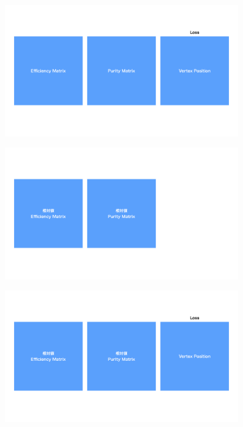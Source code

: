 \begin{figure}[htbp]
 \centering
   \begin{minipage}{1.0\textwidth}
    \centering
    \includegraphics[trim = 0 220 0 220, width=0.9\textwidth, clip]{Figure/3Networks/3-3-3-2ConfusionMatrixA.png}
    \label{3-3-3-2ConfusionMatrixA}
   \end{minipage}

   \begin{minipage}{1.0\textwidth}
   \centering
    \includegraphics[trim = 0 220 0 220, width=0.9\textwidth, clip]{Figure/3Networks/3-3-3-2ConfusionMatrixB.png}
    \label{3-3-3-2ConfusionMatrixB}
   \end{minipage}
  
  \begin{minipage}{1.0\textwidth}
   \centering
    \includegraphics[trim = 0 220 0 220, width=0.9\textwidth, clip]{Figure/3Networks/3-3-3-2ConfusionMatrixC.png}
    \label{3-3-3-2ConfusionMatrixC}
   \end{minipage}
   

\end{figure}
